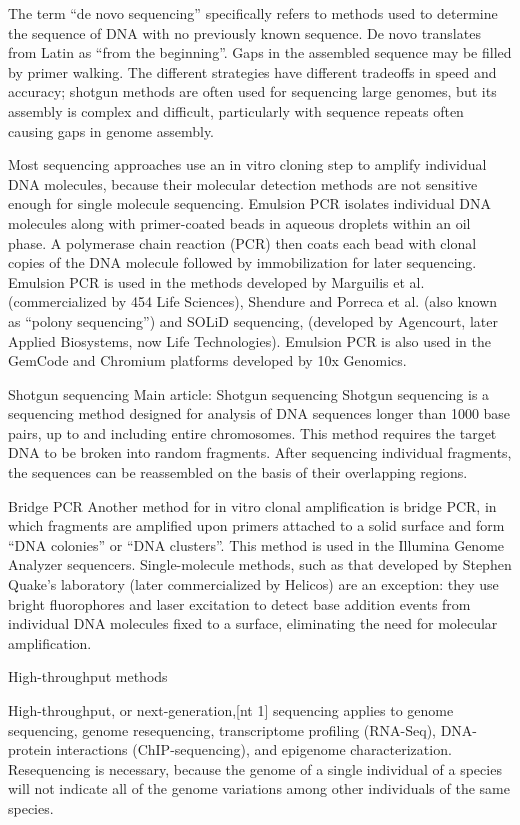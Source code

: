 The term ``de novo sequencing'' specifically refers to methods used to determine the sequence of DNA with no previously known sequence. De novo translates from Latin as ``from the beginning''. Gaps in the assembled sequence may be filled by primer walking. The different strategies have different tradeoffs in speed and accuracy; shotgun methods are often used for sequencing large genomes, but its assembly is complex and difficult, particularly with sequence repeats often causing gaps in genome assembly.

Most sequencing approaches use an in vitro cloning step to amplify individual DNA molecules, because their molecular detection methods are not sensitive enough for single molecule sequencing. Emulsion PCR isolates individual DNA molecules along with primer-coated beads in aqueous droplets within an oil phase. A polymerase chain reaction (PCR) then coats each bead with clonal copies of the DNA molecule followed by immobilization for later sequencing. Emulsion PCR is used in the methods developed by Marguilis et al. (commercialized by 454 Life Sciences), Shendure and Porreca et al. (also known as ``polony sequencing'') and SOLiD sequencing, (developed by Agencourt, later Applied Biosystems, now Life Technologies). Emulsion PCR is also used in the GemCode and Chromium platforms developed by 10x Genomics.

Shotgun sequencing
Main article: Shotgun sequencing
Shotgun sequencing is a sequencing method designed for analysis of DNA sequences longer than 1000 base pairs, up to and including entire chromosomes. This method requires the target DNA to be broken into random fragments. After sequencing individual fragments, the sequences can be reassembled on the basis of their overlapping regions.

Bridge PCR
Another method for in vitro clonal amplification is bridge PCR, in which fragments are amplified upon primers attached to a solid surface and form ``DNA colonies'' or ``DNA clusters''. This method is used in the Illumina Genome Analyzer sequencers. Single-molecule methods, such as that developed by Stephen Quake's laboratory (later commercialized by Helicos) are an exception: they use bright fluorophores and laser excitation to detect base addition events from individual DNA molecules fixed to a surface, eliminating the need for molecular amplification.

High-throughput methods

High-throughput, or next-generation,{[}nt 1{]} sequencing applies to genome sequencing, genome resequencing, transcriptome profiling (RNA-Seq), DNA-protein interactions (ChIP-sequencing), and epigenome characterization. Resequencing is necessary, because the genome of a single individual of a species will not indicate all of the genome variations among other individuals of the same species.

